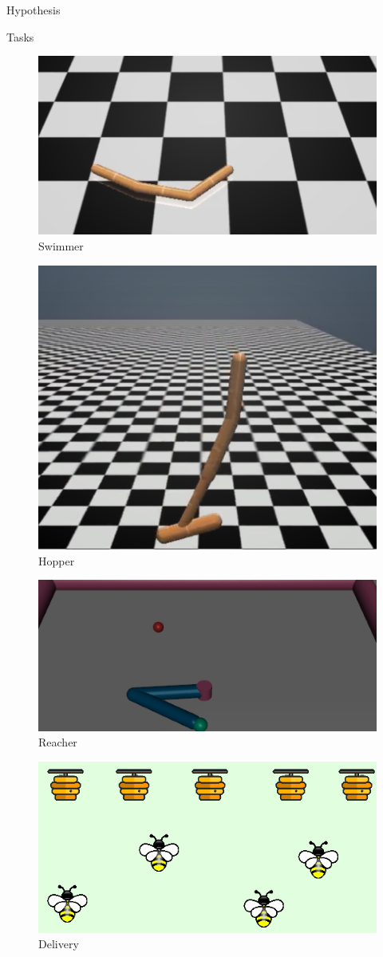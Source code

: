 \documentclass[final]{beamer}
\newlength{\onecolwid}
\newlength{\twocolwid}
\begin{document}
\begin{frame}[t]
\begin{columns}[t]
\begin{column}{\twocolwid}
\begin{columns}[t,totalwidth=\twocolwid]
\begin{column}{\onecolwid}
\begin{block}{Hypothesis}
\end{block}


\begin{block}{Tasks}

\begin{figure}
\includegraphics[width=0.5\linewidth]{swimmerenv.png}
\caption{Swimmer}
\end{figure}

\begin{figure}
\includegraphics[width=0.5\linewidth]{hopperenv.png}
\caption{Hopper}
\end{figure}

\begin{figure}
\includegraphics[width=0.5\linewidth]{reacherenv.png}
\caption{Reacher}
\end{figure}

\begin{figure}
\includegraphics[width=0.5\linewidth]{deliveryenv.png}
\caption{Delivery}
\end{figure}


\end{block}
\end{column}
\end{columns}
\end{column}
\end{columns}
\end{frame}
\end{document}

